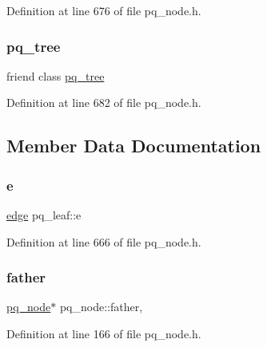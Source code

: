 Definition at line 676 of file pq\+\_\+node.\+h.

\mbox{\label{classpq__leaf_a0a5be4bb438c891059fae98f607f2a9c}} 
\subsubsection{\texorpdfstring{pq\+\_\+tree}{pq\_tree}}
{\footnotesize\ttfamily friend class \mbox{\hyperlink{classpq__tree}{pq\+\_\+tree}}\hspace{0.3cm}{\ttfamily [friend]}}



Definition at line 682 of file pq\+\_\+node.\+h.



\subsection{Member Data Documentation}
\mbox{\label{classpq__leaf_a9edebd6049b8633158d7f1db3c33ee7c}} 
\subsubsection{\texorpdfstring{e}{e}}
{\footnotesize\ttfamily \mbox{\hyperlink{classedge}{edge}} pq\+\_\+leaf\+::e\hspace{0.3cm}{\ttfamily [private]}}



Definition at line 666 of file pq\+\_\+node.\+h.

\mbox{\label{classpq__node_a3e7c886498c76c633f057fb42ff9c435}} 
\subsubsection{\texorpdfstring{father}{father}}
{\footnotesize\ttfamily \mbox{\hyperlink{classpq__node}{pq\+\_\+node}}$\ast$ pq\+\_\+node\+::father\hspace{0.3cm}{\ttfamily [protected]}, {\ttfamily [inherited]}}



Definition at line 166 of file pq\+\_\+node.\+h.

